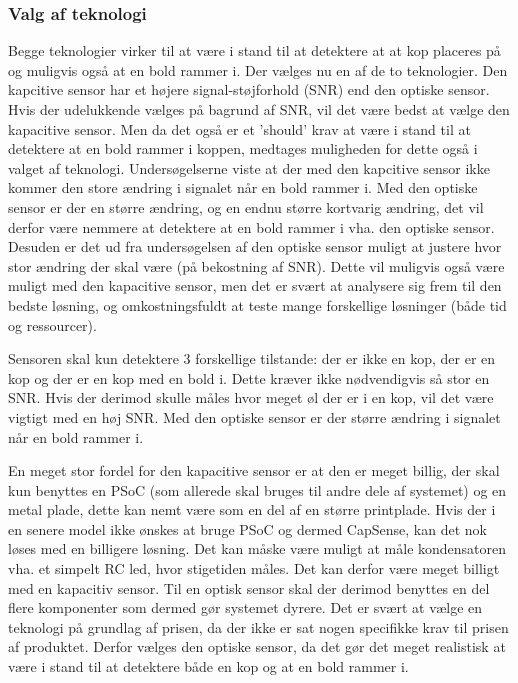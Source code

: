 \documentclass[HardwareDesign/HardwareDesign_main.tex]{subfiles}
\begin{document}
\subsubsection{Valg af teknologi}
Begge teknologier virker til at være i stand til at detektere at at kop placeres på og muligvis også at en bold rammer i.
Der vælges nu en af de to teknologier. Den kapcitive sensor har et højere signal-støjforhold (SNR) end den optiske sensor. Hvis der udelukkende vælges på bagrund af SNR, vil det være bedst at vælge den kapacitive sensor. Men da det også er et 'should' krav at være i stand til at detektere at en bold rammer i koppen, medtages muligheden for dette også i valget af teknologi. Undersøgelserne viste at der med den kapcitive sensor ikke kommer den store ændring i signalet når en bold rammer i. Med den optiske sensor er der en større ændring, og en endnu større kortvarig ændring, det vil derfor være nemmere at detektere at en bold rammer i vha. den optiske sensor. Desuden er det ud fra undersøgelsen af den optiske sensor muligt at justere hvor stor ændring der skal være (på bekostning af SNR). Dette vil muligvis også være muligt med den kapacitive sensor, men det er svært at analysere sig frem til den bedste løsning, og omkostningsfuldt at teste mange forskellige løsninger (både tid og ressourcer). 

Sensoren skal kun detektere 3 forskellige tilstande: der er ikke en kop, der er en kop og der er en kop med en bold i. Dette kræver ikke nødvendigvis så stor en SNR. Hvis der derimod skulle måles hvor meget øl der er i en kop, vil det være vigtigt med en høj SNR. Med den optiske sensor er der større ændring i signalet når en bold rammer i.

En meget stor fordel for den kapacitive sensor er at den er meget billig, der skal kun benyttes en PSoC (som allerede skal bruges til andre dele af systemet) og en metal plade, dette kan nemt være som en del af en større printplade. Hvis der i en senere model ikke ønskes at bruge PSoC og dermed CapSense, kan det nok løses med en billigere løsning. Det kan måske være muligt at måle kondensatoren vha. et simpelt RC led, hvor stigetiden måles. Det kan derfor være meget billigt med en kapacitiv sensor. Til en optisk sensor skal der derimod benyttes en del flere komponenter som dermed gør systemet dyrere.
Det er svært at vælge en teknologi på grundlag af prisen, da der ikke er sat nogen specifikke krav til prisen af produktet. Derfor vælges den optiske sensor, da det gør det meget realistisk at være i stand til at detektere både en kop og at en bold rammer i.
\end{document}
